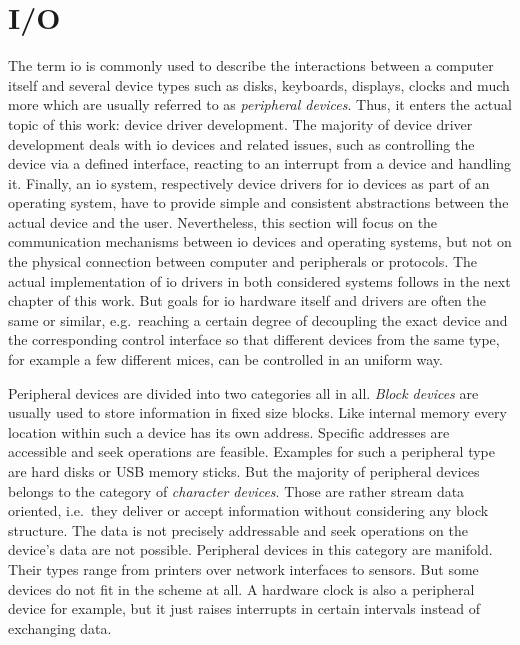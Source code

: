 \section{I/O}\label{sec:io} 
The term \acf{io} is commonly used to describe the interactions between a computer itself and several device types such as disks, keyboards, displays, clocks and much more which are usually referred to as \textit{peripheral devices}.
Thus, it enters the actual topic of this work: device driver development.
The majority of device driver development deals with \ac{io} devices and related issues, such as controlling the device via a defined interface, reacting to an interrupt from a device and handling it.
Finally, an \ac{io} system, respectively device drivers for \ac{io} devices as part of an operating system, have to provide simple and consistent abstractions between the actual device and the user\cite{tanenbaum-modern-operating-systems}.
Nevertheless, this section will focus on the communication mechanisms between \ac{io} devices and operating systems, but not on the physical connection between computer and peripherals or protocols.
The actual implementation of \ac{io} drivers in both considered systems follows in the next chapter of this work.
But goals for \ac{io} hardware itself and drivers are often the same or similar, e.g.\ reaching a certain degree of decoupling the exact device and the corresponding control interface so that different devices from the same type, for example a few different mices, can be controlled in an uniform way\cite{tanenbaum-modern-operating-systems}.

Peripheral devices are divided into two categories all in all.
\textit{Block devices} are usually used to store information in fixed size blocks.
Like internal memory every location within such a device has its own address.
Specific addresses are accessible and seek operations are feasible.
Examples for such a peripheral type are hard disks or USB memory sticks\cite{tanenbaum-modern-operating-systems}.
But the majority of peripheral devices belongs to the category of \textit{character devices}.
Those are rather stream data oriented, i.e.\ they deliver or accept information without considering any block structure.
The data is not precisely addressable and seek operations on the device's data are not possible.
Peripheral devices in this category are manifold.
Their types range from printers over network interfaces to sensors\cite{tanenbaum-modern-operating-systems}.
But some devices do not fit in the scheme at all.
A hardware clock is also a peripheral device for example, but it just raises interrupts in certain intervals instead of exchanging data.

